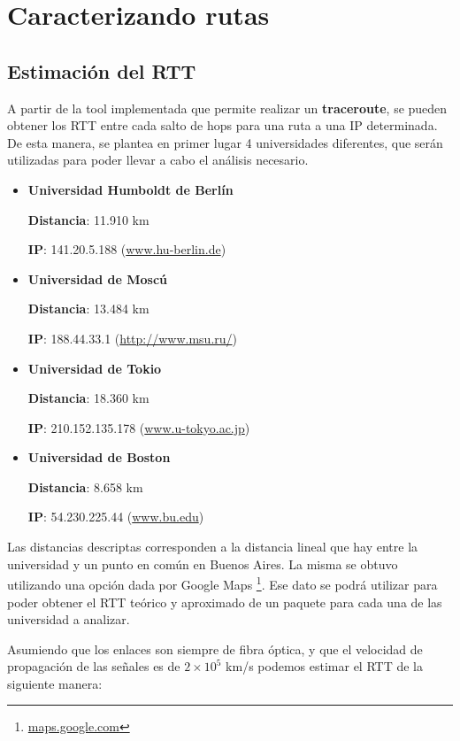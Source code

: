 \section{Caracterizando rutas}

\subsection{Estimación del RTT}
A partir de la tool implementada que permite realizar un \textbf{traceroute}, se pueden obtener los RTT entre cada salto de hops para una ruta a una IP determinada. De esta manera, se plantea en primer lugar 4 universidades diferentes, que serán utilizadas para poder llevar a cabo el análisis necesario.

\begin{itemize}
 \item {\bf Universidad Humboldt de Berlín}

	{\bf Distancia}: 11.910 km

	{\bf IP}: 141.20.5.188 (\url{www.hu-berlin.de}{})

 \item {\bf Universidad de Moscú}

	{\bf Distancia}: 13.484 km

	{\bf IP}: 188.44.33.1 (\url{http://www.msu.ru/}{})

 \item {\bf Universidad de Tokio}

	{\bf Distancia}: 18.360 km

	{\bf IP}: 210.152.135.178 (\url{www.u-tokyo.ac.jp}{})

 \item {\bf Universidad de Boston}

	{\bf Distancia}: 8.658 km

	{\bf IP}: 54.230.225.44 (\url{www.bu.edu}{})

\end{itemize}

Las distancias descriptas corresponden a la distancia lineal que hay entre la universidad y un punto en común en Buenos Aires. La misma se obtuvo utilizando una opción dada por Google Maps \footnote{\url{maps.google.com}{}}. Ese dato se podrá utilizar para poder obtener el RTT teórico y aproximado de un paquete para cada una de las universidad a analizar.

Asumiendo que los enlaces son siempre de fibra óptica, y que el velocidad de propagación de las señales es de $2 \times 10^{5}$ km/s podemos estimar el RTT de la siguiente manera:

